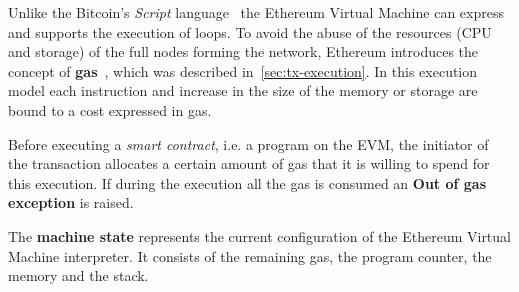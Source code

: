 Unlike the Bitcoin's \textit{Script} language~\cite{bib:masteringbitcoin} the
Ethereum Virtual Machine can express and supports the execution of loops.
To avoid the abuse of the resources (CPU and storage) of the full nodes
forming the network, Ethereum introduces the concept of
\textbf{gas}~\cite{wood2018ethereum}, which was described
in~\autoref{sec:tx-execution}. In this
execution model each instruction and increase in the size of the memory or
storage are bound to a cost expressed in gas.


Before executing a \emph{smart contract}, i.e. a program on the EVM, the
initiator of the transaction allocates a certain amount of gas that it is
willing to spend for this execution.
If during the execution all the gas is consumed an \textbf{Out of gas exception}
is raised.




The \textbf{machine state} represents the current configuration of the Ethereum
Virtual Machine interpreter. It consists of the remaining gas, the program
counter, the memory and the stack.

